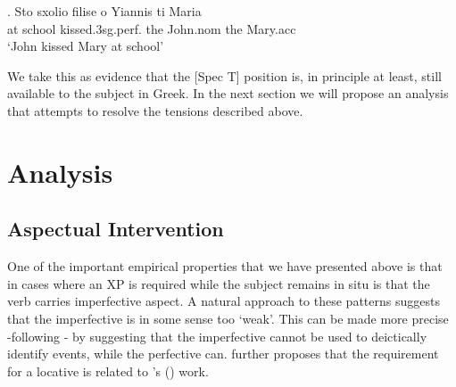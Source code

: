 \documentclass[11pt]{article}
\newcommand{\citeposs}[1]{\citeauthor{#1}'s (\citeyear{#1})}
\begin{document}
\ex.
Sto sxolio filise o Yiannis ti Maria\\
at school kissed.3sg.perf. the John.nom the Mary.acc\\
`John kissed Mary at school'

We take this as evidence that the [Spec T] position is, in principle at least, still available to the subject in Greek. In the next section we will propose an analysis that attempts to resolve the tensions described above.
 



\section{Analysis}


\subsection{Aspectual Intervention}\label{aspin}
One of the important empirical properties that we have presented above is that in cases where an XP is required while the subject remains in situ is that the verb carries imperfective aspect.  A natural approach to these patterns suggests that the imperfective is in some sense too `weak'.  This can be made more precise -following \citet{alexiadou:07}- by suggesting that the imperfective cannot be used to deictically identify events, while the perfective can.  \citet{alexiadou:07} further proposes that the requirement for a locative is related to \citeposs{partee-borchev:05} work.
\end{document}
